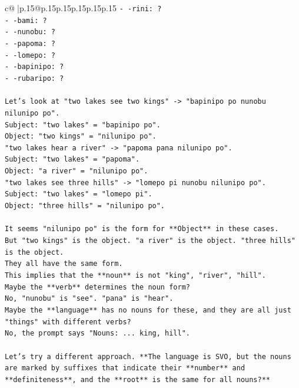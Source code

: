 \documentclass{article}
\begin{document}
{\begin{supertabular}{c@{$\;$}|p{.15\linewidth}@{}p{.15\linewidth}p{.15\linewidth}p{.15\linewidth}p{.15\linewidth}p{.15\linewidth}}
{{{\texttt{{-} {-}rini: ?} \\
\texttt{{-} {-}bami: ?} \\
\texttt{{-} {-}nunobu: ?} \\
\texttt{{-} {-}papoma: ?} \\
\texttt{{-} {-}lomepo: ?} \\
\texttt{{-} {-}bapinipo: ?} \\
\texttt{{-} {-}rubaripo: ?} \\
\\ 
\texttt{Let's look at "two lakes see two kings" {-}> "bapinipo po nunobu nilunipo po".} \\
\texttt{Subject: "two lakes" = "bapinipo po".} \\
\texttt{Object: "two kings" = "nilunipo po".} \\
\texttt{"two lakes hear a river" {-}> "papoma pana nilunipo po".} \\
\texttt{Subject: "two lakes" = "papoma".} \\
\texttt{Object: "a river" = "nilunipo po".} \\
\texttt{"two lakes see three hills" {-}> "lomepo pi nunobu nilunipo po".} \\
\texttt{Subject: "two lakes" = "lomepo pi".} \\
\texttt{Object: "three hills" = "nilunipo po".} \\
\\ 
\texttt{It seems "nilunipo po" is the form for **Object** in these cases.} \\
\texttt{But "two kings" is the object. "a river" is the object. "three hills" is the object.} \\
\texttt{They all have the same form.} \\
\texttt{This implies that the **noun** is not "king", "river", "hill".} \\
\texttt{Maybe the **verb** determines the noun form?} \\
\texttt{No, "nunobu" is "see". "pana" is "hear".} \\
\texttt{Maybe the **language** has no nouns for these, and they are all just "things" with different verbs?} \\
\texttt{No, the prompt says "Nouns: ... king, hill".} \\
\\ 
\texttt{Let's try a different approach. **The language is SVO, but the nouns are marked by suffixes that indicate their **number** and **definiteness**, and the **root** is the same for all nouns?**} \\
}}}
\end{supertabular}}
\end{document}
